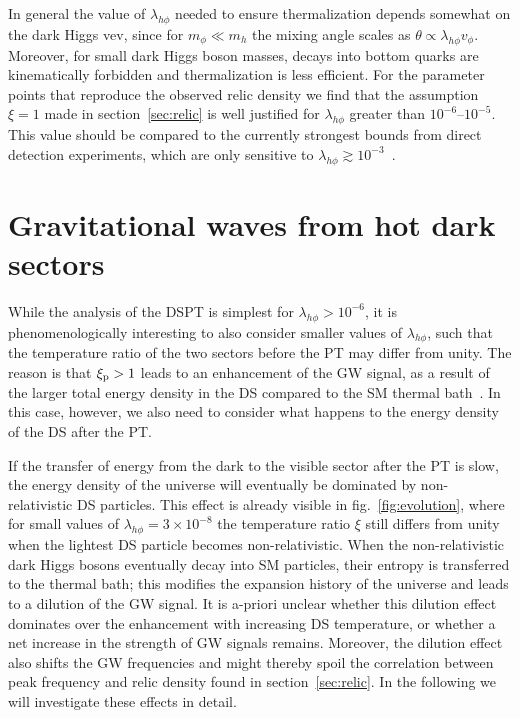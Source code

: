 In general the value of $\lambda_{h\phi}$ needed to ensure thermalization depends somewhat on the dark Higgs \ac{vev}, since for $m_\phi \ll m_h$ the mixing angle scales as $\theta \propto \lambda_{h\phi} v_{\phi}$. Moreover, for small dark Higgs boson masses, decays into bottom quarks are kinematically forbidden and thermalization is less efficient. For the parameter points that reproduce the observed relic density we find that the  assumption $\xi = 1$ made in section~\ref{sec:relic} is well justified for $\lambda_{h\phi}$ greater than $10^{-6}$--$10^{-5}$. This value should be compared to the currently strongest bounds from direct detection experiments, which are only sensitive to $\lambda_{h\phi} \gtrsim 10^{-3}$~\cite{Ferber:2023iso}.


\section{Gravitational waves from hot dark sectors}
\label{sec:hot}

While the analysis of the \ac{DSPT} is simplest for $\lambda_{h\phi} > 10^{-6}$, it is phenomenologically interesting to also consider smaller values of $\lambda_{h\phi}$, such that the temperature ratio of the  two sectors before the \ac{PT} may differ from unity. The reason is that $\xi_{\text{p}}> 1$ leads to an enhancement of the \ac{GW} signal, as a result of the larger total energy density in the \ac{DS} compared to the \ac{SM} thermal bath~\cite{Breitbach:2018ddu,Ertas:2021xeh}. In this case, however, we also need to consider what happens to the energy density of the \ac{DS} after the \ac{PT}.

If the transfer of energy from the dark to the visible sector after the \ac{PT} is slow, the energy density of the universe will eventually be dominated by non-relativistic \ac{DS} particles. This effect is already visible in fig.~\ref{fig:evolution}, where for small values of
$\lambda_{h\phi} = 3 \times 10^{-8}$ the temperature ratio $\xi$ still differs from unity when the lightest \ac{DS} particle becomes non-relativistic. When the non-relativistic dark Higgs bosons eventually decay into \ac{SM} particles, their entropy is transferred to the thermal bath; this modifies the expansion history of the universe and leads to a dilution of the \ac{GW} signal. It is a-priori unclear whether this dilution effect dominates over  the enhancement with increasing \ac{DS} temperature, or whether a net increase in the strength of \ac{GW} signals remains. Moreover, the dilution effect also shifts the \ac{GW} frequencies and might thereby spoil the correlation between peak frequency and relic density found in section~\ref{sec:relic}. In the following we will investigate these effects in detail.

